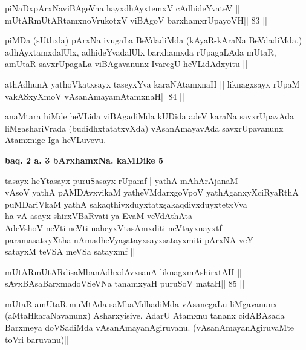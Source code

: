 

\begin{shl}
piNaDxpArxNaviBAgeVna hayxdhAyxtemxV cAdhideYvateV ||
mUtARmUtARtamxnoVrukotxV viBAgoV barxhamxrUpayoVH\hfill || 83 ||
\end{shl}

\begin{artha}
piMDa (sUthxla) pArxNa ivugaLa BeVdadiMda (kAyaR-kAraNa BeVdadiMda,)
adhAyxtamxdalUlx, adhideYvadalUlx barxhamxda rUpagaLAda mUtaR, amUtaR
savxrUpagaLa viBAgavanunx IvaregU heVLidAdxyitu ||
\end{artha}

\begin{shl}
athAdhunA yathoVkatxsayx taseyxYva karaNAtamxnaH ||
liknagxsayx rUpaM vakASxyXmoV vAsanAmayamAtamxnaH\hfill || 84 ||
\end{shl}

\begin{artha}
anaMtara hiMde heVLida viBAgadiMda kUDida adeV karaNa savxrUpavAda
liMgashariVrada (budidhxtatatxvXda) vAsanAmayavAda savxrUpavanunx
Atamxnige Iga heVLuvevu.
\end{artha}

\begin{center}
\textbf{baq. 2 a. 3 bArxhamxNa. kaMDike 5}
\end{center}

\begin{shl}
tasayx heYtasayx puruSasayx rUpamf | yathA mAhArAjanaM\\
vAsoV yathA pAMDAvxvikaM yatheVMdarxgoVpoV yathAganxyXciRyaRthA\\
puMDariVkaM yathA sakaqthivxduyxtatx\c sakaqdivxduyxtetxVva\\
ha vA asayx shirxVBaRvati ya EvaM veVdAthAta\\
AdeVshoV neVti neVti naheyxVtasAmxditi neVtayxnayxtf \\
paramasatxyXtha nAmadheVya\c satayxsayxsatayxmiti pArxNA veY\\
satayxM teVSA meVSa satayxmf ||
\end{shl}

\begin{shl}
mUtARmUtARdisaMbanAdhxdAvxsanA liknagxmAshirxtAH ||
sAvxBAsaBarxmadoVSeVNa tanamxyaH puruSoV mataH\hfill || 85 ||
\end{shl}

\begin{artha}
mUtaR-amUtaR muMtAda saMbaMdhadiMda vAsanegaLu liMgavanunx
(aMtaHkaraNavanunx) Asharxyisive. AdarU Atamxnu tananx cidABAsada
Barxmeya doVSadiMda vAsanAmayanAgiruvanu. (vAsanAmayanAgiruvaMte toVri baruvanu)|| 
\end{artha}

